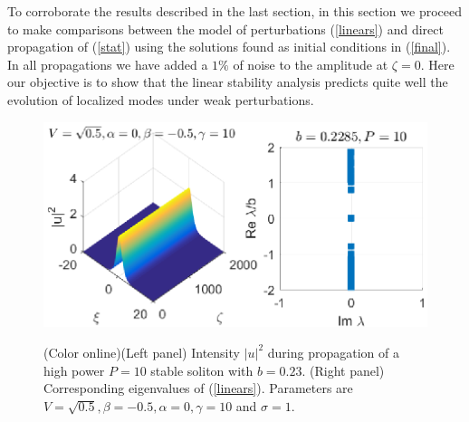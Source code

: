 \documentclass[aps,pre,showpacs,twocolumn]{revtex4}
\begin{document}
To corroborate the results described in the last section, in this section we proceed  to make comparisons between the model of perturbations (\ref{linears}) and direct propagation of (\ref{stat}) using the solutions found as initial conditions in (\ref{final}). In all propagations we have added a $1\%$ of noise to the amplitude at $\zeta=0$. Here our objective is to show that the linear stability analysis predicts quite well the evolution of localized modes under weak perturbations.
\begin{figure}[ht]
\begin{center}
\scalebox{.75} {\includegraphics{prop_V05_sat10_ds-05_c0_sigma1_highpower.eps}}
\end{center}
\caption{(Color online)(Left panel) Intensity $|u|^2$ during propagation of a high power $P=10$ stable soliton with $b=0.23$. (Right panel) Corresponding eigenvalues of (\ref{linears}). Parameters are $V=\sqrt{0.5},\beta=-0.5,\alpha=0,\gamma=10$ and $\sigma=1$.}%
\label{fig:prop_V05_sat10_ds-05_c0_sigma1_highpower}%
\end{figure}
\end{document}
